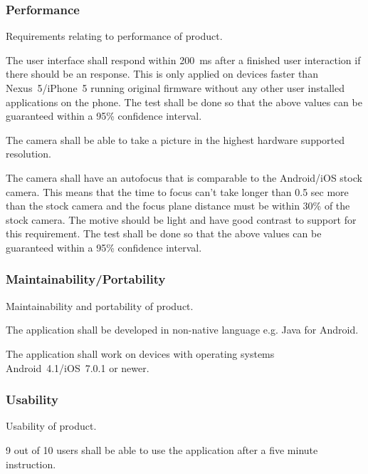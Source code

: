 \documentclass[10pt,a4paper]{article}
\begin{document}
\subsubsection{Performance}
Requirements relating to performance of product.

\begin{description}
	\item [Req \thesubsubsection {.\theperf} Speed] The user interface shall respond within 200~ms after a finished user interaction if there should be an response. This is only applied on devices faster than Nexus~5/iPhone~5 running original firmware without any other user installed applications on the phone. The test shall be done so that the above values can be guaranteed within a 95\% confidence interval.
	\item [Req \thesubsubsection {.\theperf} Picture quality] The camera shall be able to take a picture in the highest hardware supported resolution. 
	\item [Req \thesubsubsection {.\theperf} Autofocus] The camera shall have an autofocus that is comparable to the Android/iOS stock camera. This means that the time to focus can't take longer than 0.5 sec more than the stock camera and the focus plane distance must be within 30\% of the stock camera. The motive should be light and have good contrast to support for this requirement. The test shall be done so that the above values can be guaranteed within a 95\% confidence interval.
\end{description}

\subsubsection{Maintainability/Portability}
Maintainability and portability of product.
\begin{description}
	\item [Req \thesubsubsection {.\themapo} Language] The application shall be developed in non-native language e.g. Java for Android. 
	\item [Req \thesubsubsection {.\themapo} Device support] The application shall work on devices with operating systems Android~4.1/iOS~7.0.1 or newer.
\end{description}

\subsubsection{Usability}
Usability of product.
\begin{description}
	\item [Req \thesubsubsection {.\theusab} User friendly] 9 out of 10 users shall be able to use the application after a five minute instruction.
\end{description}
\end{document}
